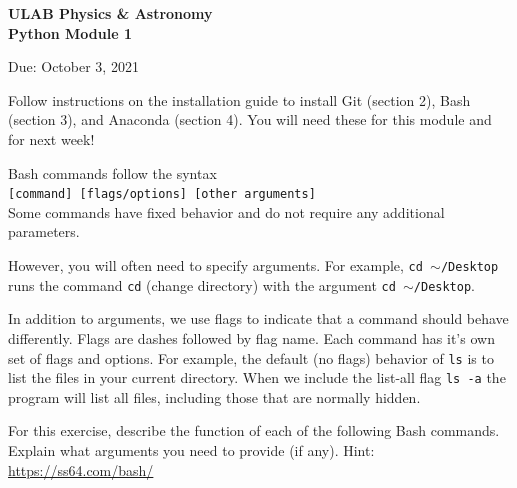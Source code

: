 \documentclass[addpoints,12pt]{exam}
\numberwithin{equation}{section}
\begin{document}
	
	\vspace*{-3cm}{\footnotesize\hfill Copyright \copyright\ 2021, Undergraduate Lab at Berkeley}
	\vspace{0.5cm}
	
	\begin{center}
		\textbf{\Large{ULAB Physics \& Astronomy\\Python Module 1}}
	\end{center}
	\begin{center}
		Due: October 3, 2021
	\end{center}
	
	\begin{questions}
		
		\question[0] Follow instructions on the installation guide to install Git (section 2), Bash (section 3), and Anaconda (section 4). You will need these for this module and for next week!
		
		\question[10] Bash commands follow the syntax \\\verb|[command] [flags/options] [other arguments]|\\Some commands have fixed behavior and do not require any additional parameters. 
		
		However, you will often need to specify arguments. For example, \verb|cd |$\sim$\verb|/Desktop| runs the command \verb|cd| (change directory) with the argument \verb|cd |$\sim$\verb|/Desktop|.
		
		In addition to arguments, we use flags to indicate that a command should behave differently. Flags are dashes followed by flag name. Each command has it's own set of flags and options. For example, the default (no flags) behavior of \verb|ls| is to list the files in your current directory. When we include the list-all flag  \verb|ls -a| the program will list all files, including those that are normally hidden.
		
		
		For this exercise, describe the function of each of the following Bash commands. Explain what arguments you need to provide (if any). Hint: \hyperref{https://ss64.com/bash/}{}{}{https://ss64.com/bash/}
		
\end{questions}
\end{document}
